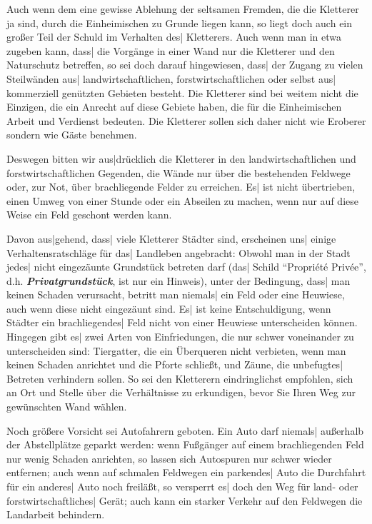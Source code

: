 \documentclass[12pt]{article}
\def\Ital#1{{\bfseries\slshape #1\/}}
\def\3{\ss}
\def\<{``}
\def\>{''}
\begin{document}
Auch wenn dem eine gewisse Ablehung der seltsamen Fremden, die die
Kletterer ja sind, durch die Einheimischen zu Grunde liegen kann, so
liegt doch auch ein gro\3er Teil der Schuld im Verhalten des|
Kletterers. Auch wenn man in etwa zugeben kann, das{}s| die Vorg\"ange in
einer Wand nur die Kletterer und den Naturschutz betreffen, so sei
doch darauf hingewiesen, das{}s| der Zugang zu vielen Steilw\"anden aus|
landwirtschaftlichen, forstwirtschaftlichen oder selbst aus|
kommerziell gen\"utzten Gebieten besteht. Die Kletterer sind bei weitem
nicht die Einzigen, die ein Anrecht auf diese Gebiete haben, die f\"ur
die Einheimischen Arbeit und Verdienst bedeuten. Die Kletterer sollen
sich daher nicht wie Eroberer sondern wie G\"aste benehmen.

 Deswegen bitten wir aus|dr\"ucklich die Kletterer in den landwirtschaftlichen
und forstwirtschaftlichen Gegenden, die W\"ande nur \"uber die bestehenden
Feldwege oder, zur Not, \"uber brachliegende Felder zu erreichen. Es| ist
nicht \"ubertrieben, einen Umweg von einer Stunde oder ein Abseilen zu
machen, wenn nur auf diese Weise ein Feld geschont werden kann.

 Davon aus|gehend, das{}s| viele Kletterer St\"adter sind, erscheinen uns|
einige Verhaltensratschl\"age f\"ur das| Landleben angebracht: Obwohl man in
der Stadt jedes| nicht eingez\"aunte Grundst\"uck betreten darf (das| Schild
\<Propri\'et\'e Priv\'ee\>, d.h. \Ital{Privatgrundst\"uck}, ist nur ein
Hinweis), unter der Bedingung, das{}s| man keinen Schaden verursacht,
betritt man niemals| ein Feld oder
eine Heuwiese, auch wenn diese nicht eingez\"aunt sind. Es| ist keine
Entschuldigung, wenn St\"adter ein brachliegendes| Feld nicht von einer
Heuwiese unterscheiden k\"onnen. Hingegen gibt es| zwei Arten von
Einfriedungen, die nur schwer voneinander zu unterscheiden sind: Tiergatter,
die ein \"Uberqueren nicht verbieten, wenn man keinen Schaden anrichtet und
die Pforte schlie\3t, und Z\"aune, die unbefugtes| Betreten verhindern
sollen. So sei den Kletterern eindringlichst empfohlen, sich an Ort und
Stelle \"uber die Verh\"altnisse zu erkundigen, bevor Sie Ihren Weg zur
gew\"unschten Wand w\"ahlen.

 Noch gr\"o\3ere Vorsicht sei Autofahrern geboten. Ein Auto darf
niemals| au\3er\-halb der Abstellpl\"atze geparkt werden: wenn Fu\3g\"anger
auf einem brachliegenden Feld nur wenig Schaden anrichten, so lassen
sich Autospuren nur schwer wieder entfernen; auch wenn auf schmalen
Feldwegen ein parkendes| Auto die Durchfahrt f\"ur ein anderes| Auto noch
freil\"a\3t, so versperrt es| doch den Weg f\"ur land- oder
forstwirtschaftliches| Ger\"at; auch kann ein starker Verkehr auf den
Feldwegen die Landarbeit behindern.
\end{document}
